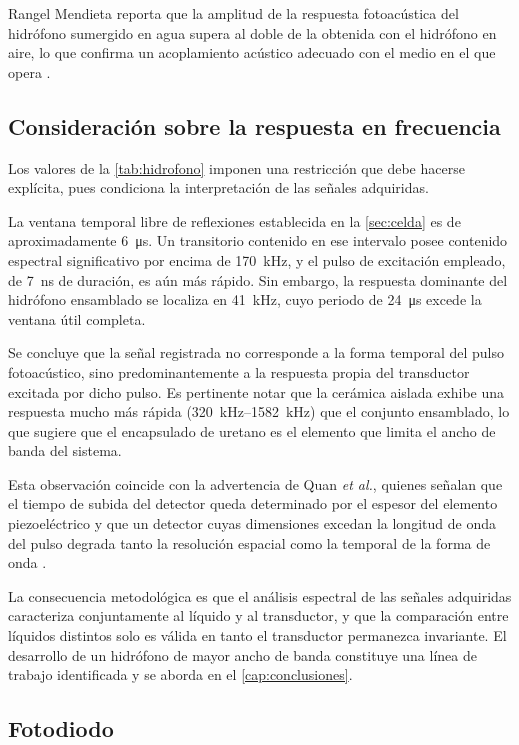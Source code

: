 Rangel Mendieta reporta que la amplitud de la respuesta fotoacústica
del hidrófono sumergido en agua supera al doble de la obtenida con el
hidrófono en aire, lo que confirma un acoplamiento acústico adecuado
con el medio en el que opera \cite{Rangel2023}.

\subsection*{Consideración sobre la respuesta en frecuencia}

Los valores de la \cref{tab:hidrofono} imponen una restricción que
debe hacerse explícita, pues condiciona la interpretación de las
señales adquiridas.

La ventana temporal libre de reflexiones establecida en la
\cref{sec:celda} es de aproximadamente \SI{6}{\micro\second}. Un
transitorio contenido en ese intervalo posee contenido espectral
significativo por encima de \SI{170}{\kilo\hertz}, y el pulso de
excitación empleado, de \SI{7}{\nano\second} de duración, es aún más
rápido. Sin embargo, la respuesta dominante del hidrófono ensamblado
se localiza en \SI{41}{\kilo\hertz}, cuyo periodo de
\SI{24}{\micro\second} excede la ventana útil completa.

Se concluye que la señal registrada no corresponde a la forma
temporal del pulso fotoacústico, sino predominantemente a la
respuesta propia del transductor excitada por dicho pulso. Es
pertinente notar que la cerámica aislada exhibe una respuesta mucho
más rápida (\SIrange{320}{1582}{\kilo\hertz}) que el conjunto
ensamblado, lo que sugiere que el encapsulado de uretano es el
elemento que limita el ancho de banda del sistema.

Esta observación coincide con la advertencia de Quan \textit{et al.},
quienes señalan que el tiempo de subida del detector queda
determinado por el espesor del elemento piezoeléctrico y que un
detector cuyas dimensiones excedan la longitud de onda del pulso
degrada tanto la resolución espacial como la temporal de la forma de
onda \cite{Quan1994}.

La consecuencia metodológica es que el análisis espectral de las
señales adquiridas caracteriza conjuntamente al líquido y al
transductor, y que la comparación entre líquidos distintos solo es
válida en tanto el transductor permanezca invariante. El desarrollo
de un hidrófono de mayor ancho de banda constituye una línea de
trabajo identificada y se aborda en el \cref{cap:conclusiones}.

\subsection*{Fotodiodo}

